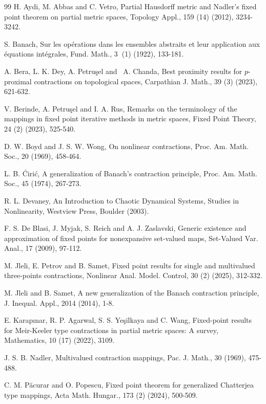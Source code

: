 \documentclass[reqno,11pt]{amsart}
\theoremstyle{plain}
\numberwithin{equation}{section}
\begin{document}
\begin{thebibliography}{99}
 H. Aydi, M. Abbas and C. Vetro, Partial Hausdorff metric and
Nadler's fixed point theorem on partial metric spaces, Topology Appl., 159
(14) (2012), 3234-3242.

 S. Banach, Sur les op\'{e}rations dans les ensembles
abstraits et leur application aux \'{e}quations int\'{e}grales, Fund. Math.,
3\textbf{\ }(1) (1922), 133-181.

 A. Bera, L. K. Dey, A. Petru\c{s}el and \ A. Chanda, Best
proximity results for $p$-proximal contractions on topological spaces,
Carpathian J. Math., 39 (3) (2023), 621-632.

 V. Berinde, A. Petru\c{s}el and I. A. Rus, Remarks on the
terminology of the mappings in fixed point iterative methods in metric
spaces, Fixed Point Theory, 24 (2) (2023), 525-540.

 D. W. Boyd and J. S. W. Wong, On nonlinear contractions, Proc.
Am. Math. Soc., 20 (1969), 458-464.

 L. B. \'{C}iri\'{c}, A generalization of Banach's contraction
principle, Proc. Am. Math. Soc., 45 (1974), 267-273.

 R. L. Devaney, An Introduction to Chaotic Dynamical Systems,
Studies in Nonlinearity, Westview Press, Boulder (2003).

 F. S. De Blasi, J. Myjak, S. Reich and A. J. Zaslavski, Generic
existence and approximation of fixed points for nonexpansive set-valued
maps, Set-Valued Var. Anal., 17 (2009), 97-112.

 M. Jleli, E. Petrov and B. Samet, Fixed point results for
single and multivalued three-points contractions, Nonlinear Anal. Model.
Control, 30 (2) (2025), 312-332.

 M. Jleli and B. Samet, A new generalization of the Banach
contraction principle, J. Inequal. Appl., 2014 (2014), 1-8.

 E. Karap\i nar, R. P. Agarwal, S. S. Ye\c{s}ilkaya and C. Wang,
Fixed-point results for Meir-Keeler type contractions in partial metric
spaces: A survey, Mathematics, 10 (17) (2022), 3109.

 J. S. B. Nadler, Multivalued contraction mappings, Pac. J.
Math., 30 (1969), 475-488.

 C. M. P\u{a}curar and O. Popescu, Fixed point theorem for
generalized Chatterjea type mappings, Acta Math. Hungar., 173 (2) (2024),
500-509.


\end{thebibliography}
\end{document}
